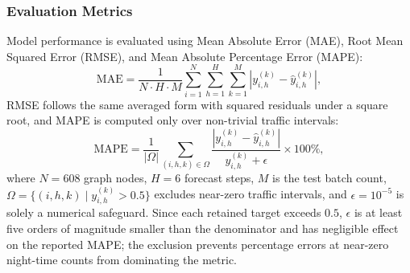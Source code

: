 \documentclass[a4paper,fleqn]{cas-sc}
\begin{document}
\subsubsection{Evaluation Metrics}
Model performance is evaluated using Mean Absolute Error (MAE), Root Mean Squared Error (RMSE), and Mean Absolute Percentage Error (MAPE):
\begin{equation}
\text{MAE} = \frac{1}{N \cdot H \cdot M} \sum_{i=1}^{N} \sum_{h=1}^{H} \sum_{k=1}^{M} \left| y_{i,h}^{(k)} - \hat{y}_{i,h}^{(k)} \right|,
\end{equation}
RMSE follows the same averaged form with squared residuals under a square root, and MAPE is computed only over non-trivial traffic intervals:
\begin{equation}
\text{MAPE} = \frac{1}{|\Omega|} \sum_{(i,h,k) \in \Omega} \frac{\left| y_{i,h}^{(k)} - \hat{y}_{i,h}^{(k)} \right|}{y_{i,h}^{(k)} + \epsilon} \times 100\%,
\end{equation}
where $N=608$ graph nodes, $H=6$ forecast steps, $M$ is the test batch count, $\Omega = \{ (i,h,k) \mid y_{i,h}^{(k)} > 0.5 \}$ excludes near-zero traffic intervals, and $\epsilon = 10^{-5}$ is solely a numerical safeguard. Since each retained target exceeds $0.5$, $\epsilon$ is at least five orders of magnitude smaller than the denominator and has negligible effect on the reported MAPE; the exclusion prevents percentage errors at near-zero night-time counts from dominating the metric.
\end{document}
